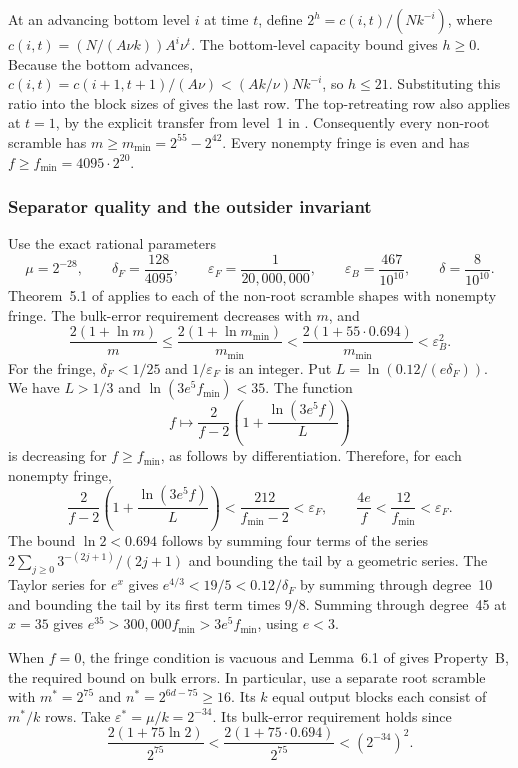 \documentclass[11pt]{article}
\begin{document}
At an advancing bottom level \(i\) at time \(t\), define \(2^h=c(i,t)/(Nk^{-i})\), where \(c(i,t)=(N/(A\nu k))A^i\nu^t\). The bottom-level capacity bound gives \(h\ge0\). Because the bottom advances, \(c(i,t)=c(i+1,t+1)/(A\nu)<(Ak/\nu)Nk^{-i}\), so \(h\le21\). Substituting this ratio into the block sizes of \cite[\S5]{chvatal} gives the last row. The top-retreating row also applies at \(t=1\), by the explicit transfer from level~1 in \cite[\S3]{chvatal}. Consequently every non-root scramble has \(m\ge m_{\min}=2^{55}-2^{42}\). Every nonempty fringe is even and has \(f\ge f_{\min}=4095\cdot2^{20}\).


\subsubsection{Separator quality and the outsider invariant}

Use the exact rational parameters
\[
 \mu=2^{-28},\qquad \delta_F=\frac{128}{4095},\qquad
 \varepsilon_F=\frac{1}{20{,}000{,}000},\qquad
 \varepsilon_B=\frac{467}{10^{10}},\qquad \delta=\frac{8}{10^{10}}.
\]
Theorem~5.1 of \cite{chvatal} applies to each of the non-root scramble shapes with nonempty fringe. The bulk-error requirement decreases with \(m\), and
\[
 \frac{2(1+\ln m)}{m}\le
 \frac{2(1+\ln m_{\min})}{m_{\min}}
 < \frac{2(1+55\cdot 0.694)}{m_{\min}} < \varepsilon_B^2.
\]
For the fringe, \(\delta_F<1/25\) and \(1/\varepsilon_F\) is an integer. Put \(L=\ln(0.12/(e\delta_F))\). We have \(L>1/3\) and \(\ln(3e^5 f_{\min})<35\). The function
\[
 f\longmapsto \frac{2}{f-2}\left(1+\frac{\ln(3e^5f)}{L}\right)
\]
is decreasing for \(f\ge f_{\min}\), as follows by differentiation. Therefore, for each nonempty fringe,
\[
 \frac{2}{f-2}\left(1+\frac{\ln(3e^5f)}{L}\right)
 < \frac{212}{f_{\min}-2}<\varepsilon_F,
 \qquad \frac{4e}{f}<\frac{12}{f_{\min}}<\varepsilon_F.
\]
The bound \(\ln 2<0.694\) follows by summing four terms of the series \(2\sum_{j\ge0}3^{-(2j+1)}/(2j+1)\) and bounding the tail by a geometric series. The Taylor series for \(e^x\) gives \(e^{4/3}<19/5<0.12/\delta_F\) by summing through degree~10 and bounding the tail by its first term times \(9/8\). Summing through degree~45 at \(x=35\) gives \(e^{35}>300{,}000 f_{\min}>3 e^5 f_{\min}\), using \(e<3\).

When \(f=0\), the fringe condition is vacuous and Lemma~6.1 of \cite{chvatal} gives Property~B, the required bound on bulk errors. In particular, use a separate root scramble with \(m^*=2^{75}\) and \(n^*=2^{6d-75}\ge16\). Its \(k\) equal output blocks each consist of \(m^*/k\) rows. Take \(\varepsilon^*=\mu/k=2^{-34}\). Its bulk-error requirement holds since
\[
 \frac{2(1+75\ln 2)}{2^{75}}<
 \frac{2(1+75\cdot0.694)}{2^{75}}<(2^{-34})^2.
\]
\end{document}
